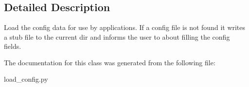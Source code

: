 \subsection{Detailed Description}
\begin{DoxyVerb}Load the config data for use by applications.
If a config file is not found it writes a stub file to the current dir
and informs the user to about filling the config fields.\end{DoxyVerb}
 

The documentation for this class was generated from the following file:\begin{DoxyCompactItemize}
\item 
load\_\-config.py\end{DoxyCompactItemize}
